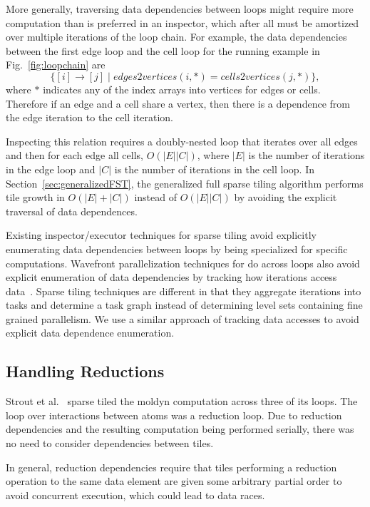 More generally, traversing data dependencies between loops might require more computation
than is preferred in an inspector, which after all must be amortized over multiple iterations of the loop chain.
For example, the data dependencies between the first edge loop and the 
cell loop for the running example in Fig.~\ref{fig:loopchain} are
\[
	\{ [ i ] \rightarrow [ j ] \; | \; edges2vertices(i,*)=cells2vertices(j,*) \},
\]
where $*$ indicates any of the index arrays into vertices for edges or cells.
Therefore if an edge and a cell share a vertex, then there is a dependence from the edge
iteration to the cell iteration.

Inspecting this relation requires a doubly-nested loop that iterates
over all edges and then for each edge all cells, $O(|E|  |C|)$, where
$|E|$ is the number of iterations in the edge loop and $|C|$ is the number
of iterations in the cell loop.
In Section~\ref{sec:generalizedFST}, the generalized full sparse tiling
algorithm performs tile growth in $O(|E| + |C|)$ instead of $O(|E|  |C|)$
by avoiding the explicit traversal of data dependences.

Existing inspector/executor techniques for sparse tiling avoid
explicitly enumerating data dependencies between loops by being specialized
for specific computations.  Wavefront parallelization techniques
for do across loops also avoid explicit enumeration of data dependencies
by tracking how iterations access data~\cite{Rauchwerger:1998:RTP}.
Sparse tiling techniques are different in that they aggregate iterations into tasks
and determine a task graph instead of determining level sets containing fine
grained parallelism.  We use a similar approach of tracking data accesses
to avoid explicit data dependence enumeration.



\subsection{Handling Reductions}
\label{sec:reduction}

Strout et al.~\cite{StroutPLDI03} sparse tiled the moldyn computation
across three of its loops.  The loop over interactions between atoms
was a reduction loop.  Due to reduction dependencies and the resulting computation being performed
serially, there was no need to consider dependencies between tiles.

In general, reduction dependencies require that
tiles performing a reduction operation to the same data element
are given some arbitrary
partial order to avoid concurrent execution, which could lead to data races.

